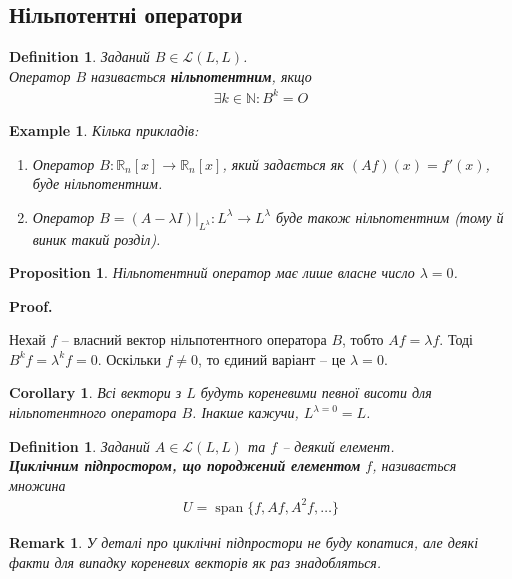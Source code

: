 \documentclass[a4paper, 10pt]{article}
\makeatletter
\theoremstyle{theoremdd}
\newtheorem{definition}[theorem]{Definition}
\newtheorem{example}[theorem]{Example}
\newtheorem{proposition}[theorem]{Proposition}
\newtheorem{remark}[theorem]{Remark}
\newtheorem{corollary}[theorem]{Corollary}
\DeclareMathOperator{\linspan}{span}
\renewenvironment{proof}[1][Proof.\\]{\par
\pushQED{\hfill \qed}%
\normalfont \topsep6\p@\@plus6\p@\relax
\trivlist
\item\relax
{\bfseries
#1\@addpunct{.}}\hspace\labelsep\ignorespaces
}{%
\popQED\endtrivlist\@endpefalse
}
\makeatother
\begin{document}
\subsection{Нільпотентні оператори}
\begin{definition}
Заданий $B \in \mathcal{L}(L,L)$.\\
Оператор $B$ називається \textbf{нільпотентним}, якщо
\begin{align*}
\exists k \in \mathbb{N}: B^k = O
\end{align*}
\end{definition}

\begin{example}
Кілька прикладів:
\begin{enumerate}[nosep,wide=0pt,label={\arabic*)}]
\item Оператор $B \colon \mathbb{R}_n[x] \to \mathbb{R}_n[x]$, який задається як $(Af)(x) = f'(x)$, буде нільпотентним.
\item Оператор $B = (A-\lambda I)|_{L^\lambda} \colon L^{\lambda} \to L^{\lambda}$ буде також нільпотентним (тому й виник такий розділ).
\end{enumerate}
\end{example}

\begin{proposition}
Нільпотентний оператор має лише власне число $\lambda = 0$.
\end{proposition}

\begin{proof}
Нехай $f$ -- власний вектор нільпотентного оператора $B$, тобто $Af = \lambda f$. Тоді $B^k f = \lambda^k f = 0$. Оскільки $f \neq 0$, то єдиний варіант -- це $\lambda = 0$.
\end{proof}

\begin{corollary}
Всі вектори з $L$ будуть кореневими певної висоти для нільпотентного оператора $B$. Інакше кажучи, $L^{\lambda =  0} = L$.
\end{corollary}

\begin{definition}
Заданий $A \in \mathcal{L}(L,L)$ та $f$ -- деякий елемент.\\
\textbf{Циклічним підпростором, що породжений елементом} $f$, називається множина
\begin{align*}
U = \linspan\{f,Af,A^2f,\dots\}
\end{align*}
\end{definition}

\begin{remark}
У деталі про циклічні підпростори не буду копатися, але деякі факти для випадку кореневих векторів як раз знадобляться.
\end{remark}
\end{document}
